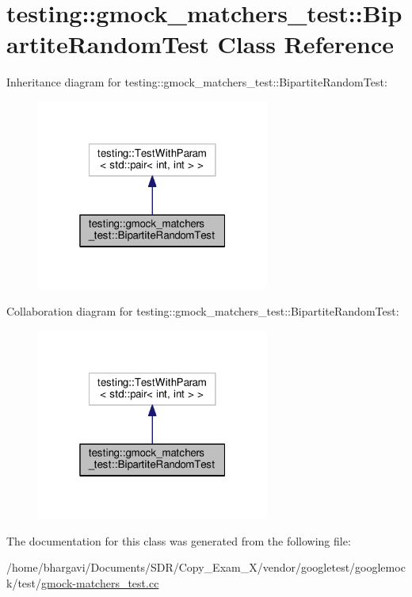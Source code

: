 \hypertarget{classtesting_1_1gmock__matchers__test_1_1_bipartite_random_test}{}\section{testing\+:\+:gmock\+\_\+matchers\+\_\+test\+:\+:Bipartite\+Random\+Test Class Reference}
\label{classtesting_1_1gmock__matchers__test_1_1_bipartite_random_test}


Inheritance diagram for testing\+:\+:gmock\+\_\+matchers\+\_\+test\+:\+:Bipartite\+Random\+Test\+:
\nopagebreak
\begin{figure}[H]
\begin{center}
\leavevmode
\includegraphics[width=217pt]{classtesting_1_1gmock__matchers__test_1_1_bipartite_random_test__inherit__graph}
\end{center}
\end{figure}


Collaboration diagram for testing\+:\+:gmock\+\_\+matchers\+\_\+test\+:\+:Bipartite\+Random\+Test\+:
\nopagebreak
\begin{figure}[H]
\begin{center}
\leavevmode
\includegraphics[width=217pt]{classtesting_1_1gmock__matchers__test_1_1_bipartite_random_test__coll__graph}
\end{center}
\end{figure}


The documentation for this class was generated from the following file\+:\begin{DoxyCompactItemize}
\item 
/home/bhargavi/\+Documents/\+S\+D\+R/\+Copy\+\_\+\+Exam\+\_\+X/vendor/googletest/googlemock/test/\hyperlink{gmock-matchers__test_8cc}{gmock-\/matchers\+\_\+test.\+cc}\end{DoxyCompactItemize}
